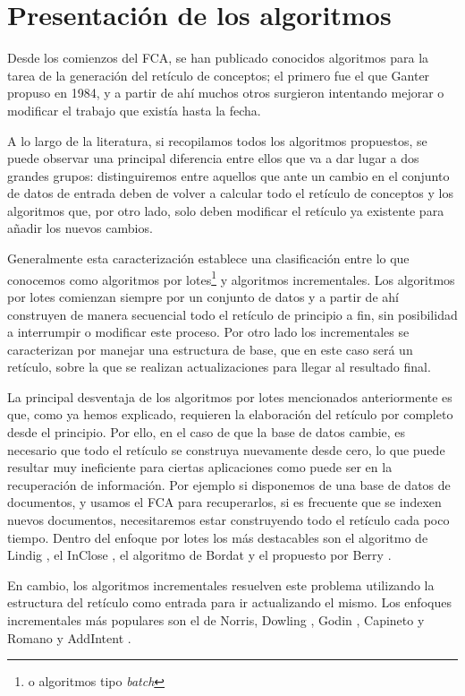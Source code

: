 \documentclass[oneside,openright,titlepage,numbers=noenddot,openany,headinclude,footinclude=true,
cleardoublepage=empty,abstractoff,BCOR=5mm,paper=a4,fontsize=12pt,main=spanish]{scrreprt}
\begin{document}
\section{Presentación de los algoritmos}\label{alg}

Desde los comienzos del FCA, se han publicado conocidos algoritmos para la tarea de la generación del retículo de conceptos; el primero fue el que Ganter\cite{Ganter} propuso en 1984, y a partir de ahí muchos otros surgieron intentando mejorar o modificar el trabajo que existía hasta la fecha.

A lo largo de la literatura, si recopilamos todos los algoritmos propuestos, se puede observar una principal diferencia entre ellos que va a dar lugar a dos grandes grupos: distinguiremos entre aquellos que ante un cambio en el conjunto de datos de entrada deben de volver a calcular todo el retículo de conceptos y los algoritmos que, por otro lado, solo deben modificar el retículo ya existente para añadir los nuevos cambios.

Generalmente esta caracterización establece una clasificación entre lo que conocemos como algoritmos por lotes\footnote{o algoritmos tipo \textit{batch}} y algoritmos incrementales. Los algoritmos por lotes comienzan siempre por un conjunto de datos y a partir de ahí construyen de manera secuencial todo el retículo de principio a fin, sin posibilidad a interrumpir o modificar este proceso. Por otro lado los incrementales se caracterizan por manejar una estructura de base, que en este caso será un retículo, sobre la que se realizan actualizaciones para llegar al resultado final. 

La principal desventaja de los algoritmos por lotes mencionados anteriormente es que, como ya hemos explicado, requieren la elaboración del retículo por completo desde el principio. Por ello, en el caso de que la base de datos cambie, es necesario que todo el retículo se construya nuevamente desde cero, lo que puede resultar muy ineficiente para ciertas aplicaciones como puede ser en la recuperación de información. Por ejemplo si disponemos de una base de datos de documentos, y usamos el FCA para recuperarlos, si es frecuente que se indexen nuevos documentos, necesitaremos estar construyendo todo el retículo cada poco tiempo. Dentro del enfoque por lotes los más destacables son el algoritmo de Lindig \cite{lindig_concept-based_nodate}, el InClose \cite{inclose}, el algoritmo de Bordat \cite{bordat_calcul_nodate} y el propuesto por Berry \cite{berry}.

En cambio, los algoritmos incrementales resuelven este problema utilizando la estructura del retículo como entrada para ir actualizando el mismo. Los enfoques incrementales más populares son el de Norris\cite{norris_algorithm_1978}, Dowling \cite{dowling_irredundant_1993}, Godin \cite{godin_incremental_1995}, Capineto y Romano \cite{carpineto_lattice_1996} y AddIntent \cite{addintent}. 
\end{document}
